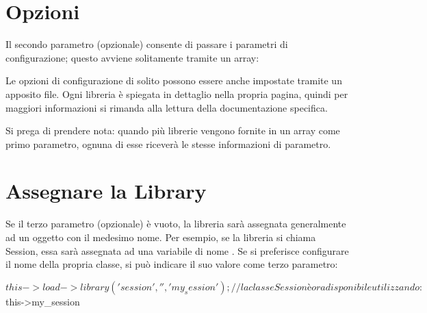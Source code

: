 \section*{Opzioni}
Il secondo parametro (opzionale) consente di passare i parametri di configurazione; questo avviene solitamente tramite un array:


Le opzioni di configurazione di solito possono essere anche impostate tramite un apposito file. Ogni libreria è spiegata in dettaglio nella propria pagina, quindi per maggiori informazioni si rimanda alla lettura della documentazione specifica.

Si prega di prendere nota: quando più librerie vengono fornite in un array come primo parametro, ognuna di esse riceverà le stesse informazioni di parametro.

\section*{Assegnare la Library}
Se il terzo parametro (opzionale) è vuoto, la libreria sarà assegnata generalmente ad un oggetto con il medesimo nome. Per esempio, se la libreria si chiama Session, essa sarà assegnata ad una variabile di nome . Se si preferisce configurare il nome della propria classe, si può indicare il suo valore come terzo parametro:

\begin{code}
$this->load->library('session', '', 'my_session');

// la classe Session è ora disponibile utilizzando:

$this->my_session
\end{code}

